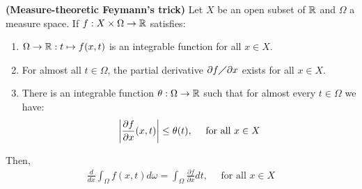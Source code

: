 \documentclass{report}
\begin{document}
\begin{theorem}
\label{THmtFt}
\textbf{(Measure-theoretic Feymann's trick)} Let $X$ be an open subset of $\mathbb{R}$ and  $\Omega$ a measure space. If $f:X\times \Omega \rightarrow \mathbb{R}$ satisfies:
\begin{enumerate}[label=(\Roman*)]
  \item $\Omega \rightarrow \mathbb{R}: t \mapsto  f(x,t)$ is an integrable function for all $x \in X$. 
  \item For almost all $t\in \Omega$, the partial derivative $\partial f \diagup \partial x$ exists for all $x \in X$. 
  \item There is an integrable function  $\theta: \Omega \rightarrow \mathbb{R}$ such that for almost every  $t \in \Omega$ we have:  
 \begin{align*}
   \left|\frac{\partial f}{\partial x} (x,t)\right|\leq \theta (t) ,\quad \text{ for all }x \in X
 \end{align*}
\end{enumerate}
Then, 
\begin{align*}
\frac{d}{dx} \int_{\Omega} f(x,t) d \omega = \int_{\Omega} \frac{\partial f}{\partial x}dt,\quad \text{ for all }x\in X
\end{align*}
\end{theorem}
\end{document}
